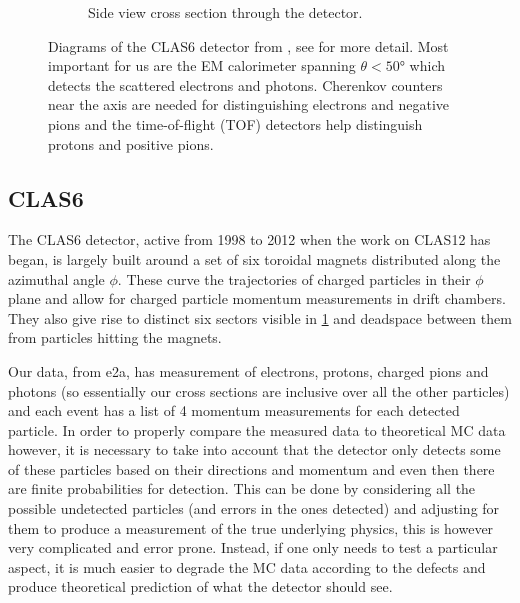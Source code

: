 \documentclass[a4paper,12pt]{article}
\begin{document}
\begin{figure}[H]
\begin{subfigure}[b]{0.5\textwidth}
        \caption{Side view cross section through the detector.}
    \end{subfigure}
    \caption{\label{fig:CLAS}
        Diagrams of the CLAS6 detector from \cite{meckingCEBAFLargeAcceptance2003}, see for more detail.
        Most important for us are the EM calorimeter spanning $\theta < 50\si{\degree}$ which detects the scattered electrons and photons.
        Cherenkov counters near the axis are needed for distinguishing electrons and negative pions and the time-of-flight (TOF) detectors help distinguish protons and positive pions.
    }
\end{figure}

\subsection{CLAS6}\label{sec:CLAS6}
The CLAS6 detector, active from 1998 to 2012 when the work on CLAS12 has began, is largely built around a set of six toroidal magnets distributed along the azimuthal angle $\phi$.
These curve the trajectories of charged particles in their $\phi$ plane and allow for charged particle momentum measurements in drift chambers.
They also give rise to distinct six sectors visible in \cref{fig:CLAS} and deadspace between them from particles hitting the magnets.

Our data, from e2a, has measurement of electrons, protons, charged pions and photons (so essentially our cross sections are inclusive over all the other particles) and each event has a list of 4 momentum measurements for each detected particle.
In order to properly compare the measured data to theoretical MC data however, it is necessary to take into account that the detector only detects some of these particles based on their directions and momentum and even then there are finite probabilities for detection.
This can be done by considering all the possible undetected particles (and errors in the ones detected) and adjusting for them to produce a measurement of the true underlying physics, this is however very complicated and error prone.
Instead, if one only needs to test a particular aspect, it is much easier to degrade the MC data according to the defects and produce theoretical prediction of what the detector should see.
\end{document}
